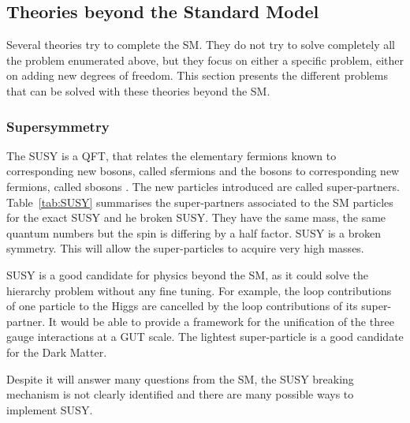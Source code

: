     \subsection{Theories beyond the Standard Model}

      Several theories try to complete the \gls{SM}. 
      They do not try to solve completely all the problem enumerated above, but they focus on either a specific problem, either on adding new degrees of freedom.
      This section presents the different problems that can be solved with these theories beyond the \gls{SM}.

      \subsubsection{Supersymmetry}
    
      The \gls{SUSY} is a \gls{QFT}, that relates the elementary fermions known to corresponding new bosons, called sfermions and the bosons to corresponding new fermions, called sbosons \cite{Signer2009}.
      The new particles introduced are called super-partners.
      Table~\ref{tab:SUSY} summarises the super-partners associated to the \gls{SM} particles for the exact \gls{SUSY} and he broken \gls{SUSY}.
      They have the same mass, the same quantum numbers but the spin is differing by a half factor.
      \gls{SUSY} is a broken symmetry. 
      This will allow the super-particles to acquire very high masses.

      \gls{SUSY} is a good candidate for physics beyond the \gls{SM}, as it could solve the hierarchy problem without any fine tuning.
      For example, the loop contributions of one particle to the Higgs are cancelled by the loop contributions of its super-partner.
      It would be able to provide a framework for the unification of the three gauge interactions at a GUT scale.
      The lightest super-particle is a good candidate for the Dark Matter.

      Despite it will answer many questions from the \gls{SM}, the \gls{SUSY} breaking mechanism is not clearly identified and there are many possible ways to implement \gls{SUSY}.
      

